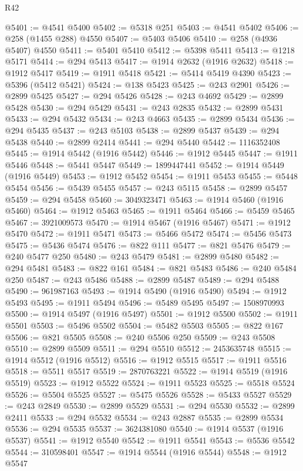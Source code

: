 \begin{lexlean}{R42}
\begin{coremodule}
{@5401 := @4541 @5400
@5402 := @5318 @251
@5403 := @4541 @5402
@5406 := @258 (@1455 @288) @4550
@5407 := @5403 @5406
@5410 := @258 (@4936 @5407) @4550
@5411 := @5401 @5410
@5412 := @5398 @5411
@5413 := @1218 @5171
@5414 := @294 @5413
@5417 := @1914 @2632 (@1916 @2632)
@5418 := @1912 @5417
@5419 := @1911 @5418
@5421 := @5414 @5419 @4390
@5423 := @5396 (@5412 @5421)
@5424 := @138 @5423
@5425 := @243 @2901
@5426 := @2899 @5425
@5427 := @294 @5426
@5428 := @243 @4692
@5429 := @2899 @5428
@5430 := @294 @5429
@5431 := @243 @2835
@5432 := @2899 @5431
@5433 := @294 @5432
@5434 := @243 @4663
@5435 := @2899 @5434
@5436 := @294 @5435
@5437 := @243 @5103
@5438 := @2899 @5437
@5439 := @294 @5438
@5440 := @2899 @2414
@5441 := @294 @5440
@5442 := 1116352408
@5445 := @1914 @5442 (@1916 @5442)
@5446 := @1912 @5445
@5447 := @1911 @5446
@5448 := @5441 @5447
@5449 := 1899447441
@5452 := @1914 @5449 (@1916 @5449)
@5453 := @1912 @5452
@5454 := @1911 @5453
@5455 := @5448 @5454
@5456 := @5439 @5455
@5457 := @243 @5115
@5458 := @2899 @5457
@5459 := @294 @5458
@5460 := 3049323471
@5463 := @1914 @5460 (@1916 @5460)
@5464 := @1912 @5463
@5465 := @1911 @5464
@5466 := @5459 @5465
@5467 := 3921009573
@5470 := @1914 @5467 (@1916 @5467)
@5471 := @1912 @5470
@5472 := @1911 @5471
@5473 := @5466 @5472
@5474 := @5456 @5473
@5475 := @5436 @5474
@5476 := @822 @111
@5477 := @821 @5476
@5479 := @240 @5477 @250
@5480 := @243 @5479
@5481 := @2899 @5480
@5482 := @294 @5481
@5483 := @822 @161
@5484 := @821 @5483
@5486 := @240 @5484 @250
@5487 := @243 @5486
@5488 := @2899 @5487
@5489 := @294 @5488
@5490 := 961987163
@5493 := @1914 @5490 (@1916 @5490)
@5494 := @1912 @5493
@5495 := @1911 @5494
@5496 := @5489 @5495
@5497 := 1508970993
@5500 := @1914 @5497 (@1916 @5497)
@5501 := @1912 @5500
@5502 := @1911 @5501
@5503 := @5496 @5502
@5504 := @5482 @5503
@5505 := @822 @167
@5506 := @821 @5505
@5508 := @240 @5506 @250
@5509 := @243 @5508
@5510 := @2899 @5509
@5511 := @294 @5510
@5512 := 2453635748
@5515 := @1914 @5512 (@1916 @5512)
@5516 := @1912 @5515
@5517 := @1911 @5516
@5518 := @5511 @5517
@5519 := 2870763221
@5522 := @1914 @5519 (@1916 @5519)
@5523 := @1912 @5522
@5524 := @1911 @5523
@5525 := @5518 @5524
@5526 := @5504 @5525
@5527 := @5475 @5526
@5528 := @5433 @5527
@5529 := @243 @2849
@5530 := @2899 @5529
@5531 := @294 @5530
@5532 := @2899 @2411
@5533 := @294 @5532
@5534 := @243 @2887
@5535 := @2899 @5534
@5536 := @294 @5535
@5537 := 3624381080
@5540 := @1914 @5537 (@1916 @5537)
@5541 := @1912 @5540
@5542 := @1911 @5541
@5543 := @5536 @5542
@5544 := 310598401
@5547 := @1914 @5544 (@1916 @5544)
@5548 := @1912 @5547
}
\end{coremodule}
\end{lexlean}
